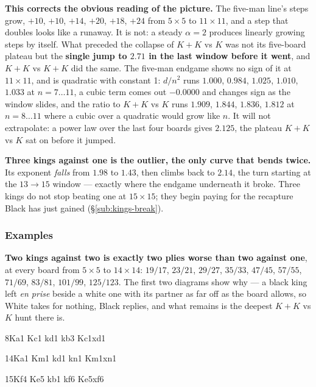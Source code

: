 \documentclass[10pt]{article}
\begin{document}
\noindent
\textbf{This corrects the obvious reading of the picture.} The five-man line's
steps grow, $+10$, $+10$, $+14$, $+20$, $+18$, $+24$ from $5\times5$ to
$11\times11$, and a step that doubles looks like a runaway. It is not: a steady
$\alpha=2$ produces linearly growing steps by itself. What preceded the
collapse of $K\!+\!K$ vs $K$ was not its five-board plateau but the
\textbf{single jump to $2.71$ in the last window before it went}, and
$K\!+\!K$ vs $K\!+\!K$ did the same. The five-man endgame shows no sign of it
at $11\times11$, and is quadratic with constant 1: $d/n^2$ runs $1.000$,
$0.984$, $1.025$, $1.010$, $1.033$ at $n=7\ldots11$, a cubic term comes out
$-0.0000$ and changes sign as the window slides, and the ratio to $K\!+\!K$ vs
$K$ runs $1.909$, $1.844$, $1.836$, $1.812$ at $n=8\ldots11$ where a cubic over
a quadratic would grow like $n$. It
will not extrapolate: a power law over the last four boards gives $2.125$, the
plateau $K\!+\!K$ vs $K$ sat on before it jumped.

\textbf{Three kings against one is the outlier, the only curve that bends
twice.} Its exponent \emph{falls} from $1.98$ to $1.43$, then climbs back to
$2.14$, the turn starting at the $13\to15$ window --- exactly where the endgame
underneath it broke. Three kings do not stop beating one at $15\times15$; they
begin paying for the recapture Black has just gained
(\S\ref{sub:kings-break}).

\subsubsection{Examples}\label{sub:kings-ident}

\noindent
\textbf{Two kings against two is exactly two plies worse than two against one},
at every board from $5\times5$ to $14\times14$: $19/17$, $23/21$, $29/27$,
$35/33$, $47/45$, $57/55$, $71/69$, $83/81$, $101/99$, $125/123$. The first two
diagrams show why --- a black king left \emph{en prise} beside a white one with
its partner as far off as the board allows, so White takes for nothing, Black
replies, and what remains is the deepest $K\!+\!K$ vs $K$ hunt there is.

\medskip
\noindent
\begin{stepboard}[width=0.30\textwidth,board=2.89cm,height=46mm,variant=C,
  intro={$8\times8$, \textbf{35 plies}: 1.\,K$c1\times d1$, then 33}]{8}{Ka1 Kc1 kd1 kb3}
  Kc1xd1
\end{stepboard}\hfill
\begin{stepboard}[width=0.30\textwidth,board=2.89cm,height=46mm,variant=C,coords=false,
  intro={$14\times14$, \textbf{125 plies}: 1.\,K$m1\times n1$, then 123}]{14}{Ka1 Km1 kd1 kn1}
  Km1xn1
\end{stepboard}\hfill
\begin{stepboard}[width=0.30\textwidth,board=2.89cm,height=46mm,variant=C,coords=false,
  intro={$15\times15$, \textbf{73 plies}: 1.\,K$e5\times f6$, then only 72}]{15}{Kf4 Ke5 kb1 kf6}
  Ke5xf6
\end{stepboard}
\end{document}
